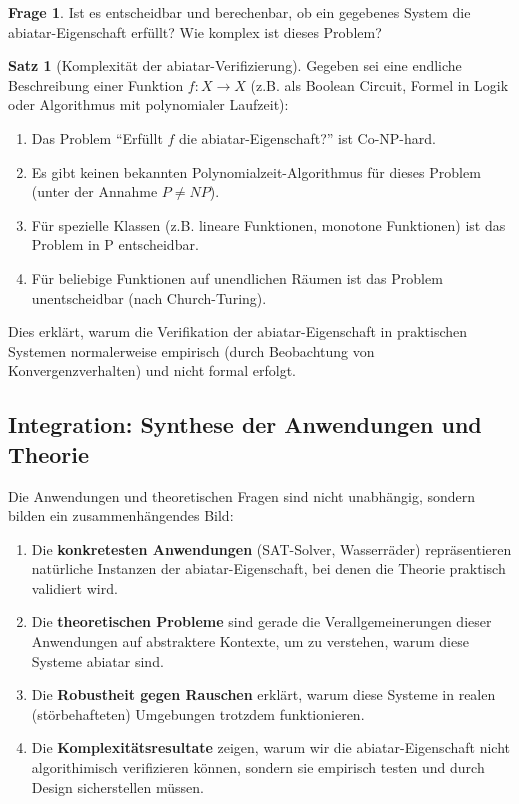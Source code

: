 \documentclass[a4paper,12pt]{article}
\theoremstyle{definition}
\newtheorem{satz}{Satz}
\newtheorem{frage}{Frage}
\begin{document}
\begin{frage}
Ist es entscheidbar und berechenbar, ob ein gegebenes System die abiatar-Eigenschaft erfüllt? Wie komplex ist dieses Problem?
\end{frage}

\begin{satz}[Komplexität der abiatar-Verifizierung]
Gegeben sei eine endliche Beschreibung einer Funktion $f: X \to X$ (z.B. als Boolean Circuit, Formel in Logik oder Algorithmus mit polynomialer Laufzeit):

\begin{enumerate}
\item Das Problem ``Erfüllt $f$ die abiatar-Eigenschaft?'' ist Co-NP-hard.

\item Es gibt keinen bekannten Polynomialzeit-Algorithmus für dieses Problem (unter der Annahme $P \neq NP$).

\item Für spezielle Klassen (z.B. lineare Funktionen, monotone Funktionen) ist das Problem in P entscheidbar.

\item Für beliebige Funktionen auf unendlichen Räumen ist das Problem unentscheidbar (nach Church-Turing).
\end{enumerate}
\end{satz}

Dies erklärt, warum die Verifikation der abiatar-Eigenschaft in praktischen Systemen normalerweise empirisch (durch Beobachtung von Konvergenzverhalten) und nicht formal erfolgt.

\subsection{Integration: Synthese der Anwendungen und Theorie}

Die Anwendungen und theoretischen Fragen sind nicht unabhängig, sondern bilden ein zusammenhängendes Bild:

\begin{enumerate}
\item Die \textbf{konkretesten Anwendungen} (SAT-Solver, Wasserräder) repräsentieren natürliche Instanzen der abiatar-Eigenschaft, bei denen die Theorie praktisch validiert wird.

\item Die \textbf{theoretischen Probleme} sind gerade die Verallgemeinerungen dieser Anwendungen auf abstraktere Kontexte, um zu verstehen, warum diese Systeme abiatar sind.

\item Die \textbf{Robustheit gegen Rauschen} erklärt, warum diese Systeme in realen (störbehafteten) Umgebungen trotzdem funktionieren.

\item Die \textbf{Komplexitätsresultate} zeigen, warum wir die abiatar-Eigenschaft nicht algorithimisch verifizieren können, sondern sie empirisch testen und durch Design sicherstellen müssen.
\end{enumerate}
\end{document}
